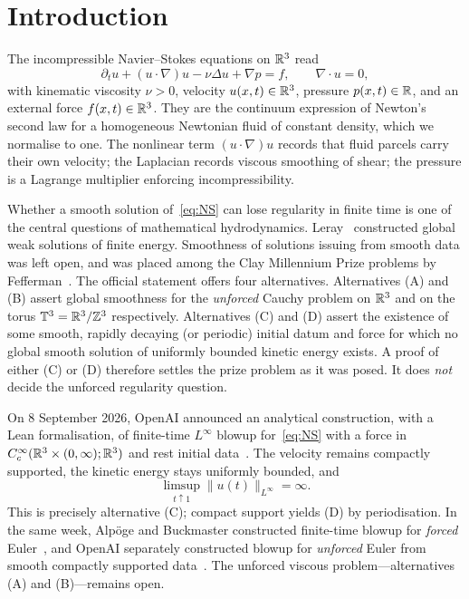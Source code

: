 \maketitle

\tableofcontents

\section{Introduction}
\label{sec:intro}

The incompressible {N}avier--{S}tokes equations on $\mathbb{R}^3$ read
\begin{equation}
\label{eq:NS}
\partial_t u+(u\cdot\nabla)u-\nu\Delta u+\nabla p=f,
\qquad
\nabla\cdot u=0,
\end{equation}
with kinematic viscosity $\nu>0$, velocity $u(x,t)\in\mathbb{R}^3$, pressure $p(x,t)\in\mathbb{R}$, and an external force $f(x,t)\in\mathbb{R}^3$. They are the continuum expression of {N}ewton's second law for a homogeneous {N}ewtonian fluid of constant density, which we normalise to one. The nonlinear term $(u\cdot\nabla)u$ records that fluid parcels carry their own velocity; the {L}aplacian records viscous smoothing of shear; the pressure is a {L}agrange multiplier enforcing incompressibility.

Whether a smooth solution of~\eqref{eq:NS} can lose regularity in finite time is one of the central questions of mathematical hydrodynamics. {L}eray~\cite{leray1934} constructed global weak solutions of finite energy. Smoothness of solutions issuing from smooth data was left open, and was placed among the {C}lay {M}illennium {P}rize problems by {F}efferman~\cite{fefferman2000}. The official statement offers four alternatives. Alternatives (A) and (B) assert global smoothness for the \emph{unforced} Cauchy problem on $\mathbb{R}^3$ and on the torus $\mathbb{T}^3=\mathbb{R}^3/\mathbb{Z}^3$ respectively. Alternatives (C) and (D) assert the existence of some smooth, rapidly decaying (or periodic) initial datum and force for which no global smooth solution of uniformly bounded kinetic energy exists. A proof of either (C) or (D) therefore settles the prize problem as it was posed. It does \emph{not} decide the unforced regularity question.

On 8 September 2026, {O}pen{AI} announced an analytical construction, with a {L}ean formalisation, of finite-time $L^\infty$ blowup for~\eqref{eq:NS} with a force in $C_c^\infty(\mathbb{R}^3\times(0,\infty);\mathbb{R}^3)$ and rest initial data~\cite{openai2026ns,openai2026blog}. The velocity remains compactly supported, the kinetic energy stays uniformly bounded, and
\[
\limsup_{t\uparrow 1}\|u(t)\|_{L^\infty}=\infty.
\]
This is precisely alternative (C); compact support yields (D) by periodisation. In the same week, {A}lp{\"o}ge and {B}uckmaster constructed finite-time blowup for \emph{forced} {E}uler~\cite{alpoegbuckmaster2026}, and {O}pen{AI} separately constructed blowup for \emph{unforced} {E}uler from smooth compactly supported data~\cite{openai2026euler}. The unforced viscous problem---alternatives (A) and (B)---remains open.


